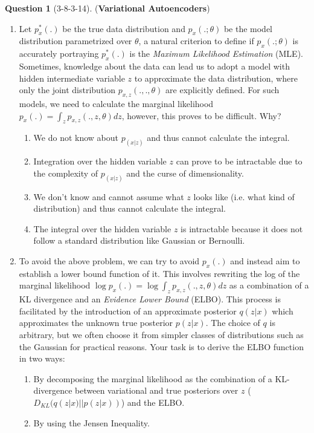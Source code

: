 \documentclass[12pt]{article}
\theoremstyle{definition}
\newtheorem{exercise}{Question}%
\begin{document}
\begin{exercise}[3-8-3-14] (\textbf{Variational Autoencoders})
\begin{enumerate}
    \item Let $p_x^*(.)$ be the true data distribution and $p_x(.;\theta)$ be the model distribution parametrized over $\theta$, a natural criterion to define if $p_x(.;\theta)$ is accurately portraying $p_x^*(.)$ is the \textit{Maximum Likelihood Estimation} (MLE). Sometimes, knowledge about the data can lead us to adopt a model with hidden intermediate variable $z$ to approximate the data distribution, where only the joint distribution $p_{x, z}(., ., \theta)$ are explicitly defined. For such models, we need to calculate the marginal likelihood $p_x(.) = \int_z p_{x, z}(., z, \theta) dz$, however, this proves to be difficult. Why?
    \begin{enumerate}
        \item We do not know about $p_(x|z)$ and thus cannot calculate the integral.
        \item Integration over the hidden variable $z$ can prove to be intractable due to the complexity of $p_(x|z)$ and the curse of dimensionality. 
        \item We don't know and cannot assume what $z$ looks like (i.e. what kind of distribution) and thus cannot calculate the integral.
        \item The integral over the hidden variable $z$ is intractable because it does not follow a standard distribution like Gaussian or Bernoulli.
    \end{enumerate}

    \item To avoid the above problem, we can try to avoid $p_x(.)$ and instead aim to establish a lower bound function of it. This involves rewriting the log of the marginal likelihood $\log p_x(.) = \log \int_z p_{x, z}(., z, \theta) dz$ as a combination of a KL divergence and an \textit{Evidence Lower Bound} (ELBO). This process is facilitated by the introduction of an approximate posterior $q(z|x)$ which approximates the unknown true posterior $p(z|x)$. The choice of $q$ is arbitrary, but we often choose it from simpler classes of distributions such as the Gaussian for practical reasons. Your task is to derive the ELBO function in two ways:
    \begin{enumerate}
        \item By decomposing the marginal likelihood as the combination of a KL-divergence between variational and true posteriors over $z$ ($D_{KL}(q(z|x) || p(z|x))$) and the ELBO. 
        \item By using the Jensen Inequality. 
    \end{enumerate}


\end{enumerate}
\end{exercise}
\end{document}
